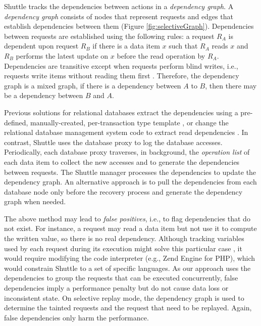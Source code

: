 Shuttle tracks the dependencies between actions in a \textit{dependency graph}. A \emph{dependency graph} consists of nodes that represent requests and edges that establish dependencies between them (Figure \ref{fig:selectiveGraph}).  Dependencies between requests are established using the following rules: a request $R_A$ is dependent upon request $R_B$ if there is a data item $x$ such that $R_A$ reads $x$ and $R_B$ performs the latest update on $x$ before the read operation by $R_A$. Dependencies are transitive except when requests perform blind writes, i.e., requests write items without reading them first \cite{Ammann2002}. Therefore, the dependency graph is a mixed graph, if there is a dependency between $A$ to $B$, then there may be a dependency between $B$ and $A$.


Previous solutions for relational databases extract the dependencies using a pre-defined, manually-created, per-transaction type template \cite{itdb}, or change the relational database management system code to extract read dependencies \cite{phoenix}. In contrast, Shuttle uses the database proxy to log the database accesses. Periodically, each database proxy traverses, in background, the \emph{operation list} of each data item to collect the new accesses and to generate the dependencies between requests. The Shuttle manager processes the dependencies to update the dependency graph. An alternative approach is to pull the dependencies from each database node only before the recovery process and generate the dependency graph when needed. 






The above method may lead to \emph{false positives}, i.e., to flag dependencies that do not exist. For instance, a request may read a data item but not use it to compute the written value, so there is no real dependency. Although tracking variables used by each request during its execution might solve this particular case \cite{goel}, it would require modifying the code interpreter (e.g., Zend Engine for PHP), which would constrain Shuttle to a set of specific languages. As our approach uses the dependencies to group the requests that can be executed concurrently, false dependencies imply a performance penalty but do not cause data loss or inconsistent state. On selective replay mode, the dependency graph is used to determine the tainted requests and the request that need to be replayed. Again, false dependencies only harm the performance.

